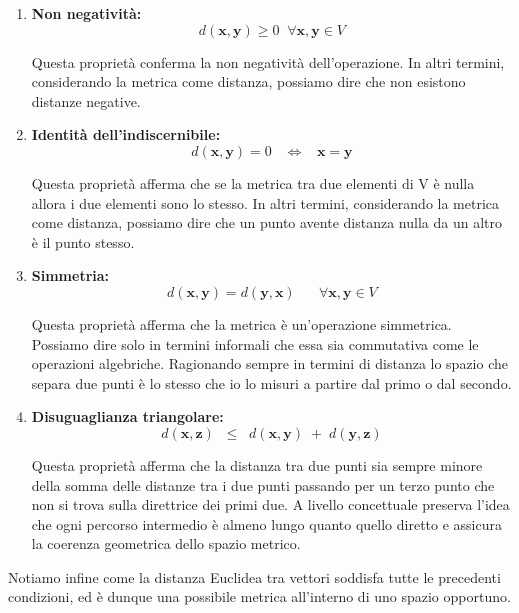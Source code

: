 \documentclass[../main.tex]{subfiles}
\begin{document}
\begin{enumerate}
	\item[\textbf{-}]\textbf{Non negatività:} \[d(\textbf{x},\textbf{y}) \geq 0 \;\; \forall \textbf{x},\textbf{y} \in V \]
	
	Questa proprietà conferma la non negatività dell'operazione. In altri termini, considerando la metrica come distanza, possiamo dire che non esistono distanze negative.
	
	\item[\textbf{-}]\textbf{Identità dell’indiscernibile:} \[ d(\textbf{x},\textbf{y}) = 0 \hspace{10pt} \Longleftrightarrow  \hspace{10pt} \textbf{x} = \textbf{y} \]
	
	Questa proprietà afferma che se la metrica tra due elementi di V è nulla allora i due elementi sono lo stesso. In altri termini, considerando la metrica come distanza, possiamo dire che un punto avente distanza nulla da un altro è il punto stesso.
	
	\item[\textbf{-}]\textbf{Simmetria:} \[ d(\textbf{x},\textbf{y}) = d(\textbf{y},\textbf{x}) \hspace{20pt} \forall \textbf{x},\textbf{y} \in V \]
	
	Questa proprietà afferma che la metrica è un'operazione simmetrica. Possiamo dire solo in termini informali che essa sia commutativa come le operazioni algebriche. Ragionando sempre in termini di distanza lo spazio che separa due punti è lo stesso che io lo misuri a partire dal primo o dal secondo.
	
	
	\item[\textbf{-}]\textbf{Disuguaglianza triangolare:} \[ d(\textbf{x},\textbf{z}) \;\;\leq \;\;d(\textbf{x},\textbf{y})\; + \;d(\textbf{y},\textbf{z})   \]
	
	
	Questa proprietà afferma che la distanza tra due punti sia sempre minore della somma delle distanze tra i due punti passando per un terzo punto che non si trova sulla direttrice dei primi due. A livello concettuale preserva l’idea che ogni percorso intermedio è almeno lungo quanto quello diretto e assicura la coerenza geometrica dello spazio metrico.
	
	
\end{enumerate}

Notiamo infine come la distanza Euclidea tra vettori soddisfa tutte le precedenti condizioni, ed è dunque una possibile metrica all'interno di uno spazio opportuno.
\end{document}
